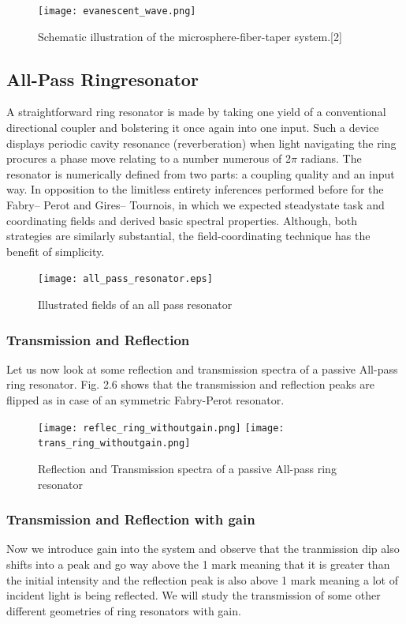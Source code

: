 \begin{figure}[h]
\centering
\texttt{[image: evanescent\_wave.png]}
\caption{Schematic illustration of the microsphere-fiber-taper
system.[2]}
\end{figure}


\subsection{All-Pass Ringresonator}
A straightforward ring resonator is made by taking one yield of a conventional directional coupler and bolstering it once again into one input. Such a device displays periodic cavity resonance (reverberation) when light navigating the ring procures a phase move relating to a number numerous of 2$\pi$ radians. The resonator is numerically defined from two parts: a coupling quality and an input way. In opposition to the limitless entirety inferences performed before for the Fabry– Perot and Gires– Tournois, in which we expected steadystate task and coordinating fields and derived basic spectral properties. Although, both strategies are similarly substantial, the field-coordinating technique has the benefit of simplicity.
\begin{figure}[h]
\centering
\texttt{[image: all\_pass\_resonator.eps]}
\caption{Illustrated fields of an all pass resonator}
\end{figure}


\subsubsection{Transmission and Reflection}
Let us now look at some reflection and transmission spectra of a passive All-pass ring resonator. Fig. 2.6 shows that the transmission and reflection peaks are flipped as in case of an symmetric Fabry-Perot resonator.
\begin{figure}[h]
\texttt{[image: reflec\_ring\_withoutgain.png]}
\texttt{[image: trans\_ring\_withoutgain.png]}
\caption{Reflection and Transmission spectra of a passive All-pass ring resonator}
\end{figure}

\subsubsection{Transmission and Reflection with gain}
Now we introduce gain into the system and observe that the tranmission dip also shifts into a peak and go way above the 1 mark meaning that it is greater than the initial intensity and the reflection peak is also above 1 mark meaning a lot of incident light is being reflected. We will study the transmission of some other different geometries of ring resonators with gain. 

